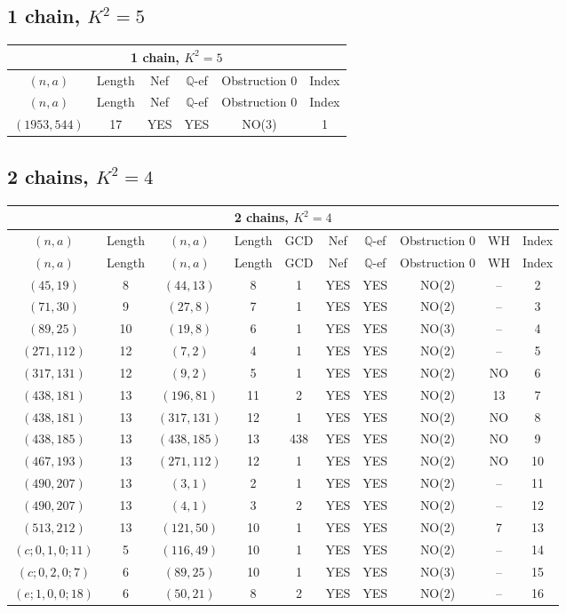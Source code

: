 \subsection{1 chain, \(K^2 = 5\)}
\begin{longtable}{|c|c|c|c|c|c|}
\hline
\multicolumn{6}{|c|}{1 chain, $K^2 = 5$}\\
\hline
$(n,a)$ & Length & Nef & $\mathbb Q$-ef & Obstruction 0 & Index\\
\hline
\endfirsthead

\hline
$(n,a)$ & Length & Nef & $\mathbb Q$-ef & Obstruction 0 & Index\\
\hline
\endhead
\hline
\endfoot

$(1953, 544)$ & 17 & YES & YES & NO(3) & 1
\end{longtable}
\subsection{2 chains, \(K^2 = 4\)}
\begin{longtable}{|c|c|c|c|c|c|c|c|c|c|}
\hline
\multicolumn{10}{|c|}{2 chains, $K^2 = 4$}\\
\hline
$(n,a)$ & Length & $(n,a)$ & Length & GCD & Nef & $\mathbb Q$-ef & Obstruction 0 & WH & Index\\
\hline
\endfirsthead

\hline
$(n,a)$ & Length & $(n,a)$ & Length & GCD & Nef & $\mathbb Q$-ef & Obstruction 0 & WH & Index\\
\hline
\endhead
\hline
\endfoot

$(45, 19)$ & 8 & $(44, 13)$ & 8 & 1 & YES & YES & NO(2) & -- & 2\\
$(71, 30)$ & 9 & $(27, 8)$ & 7 & 1 & YES & YES & NO(2) & -- & 3\\
$(89, 25)$ & 10 & $(19, 8)$ & 6 & 1 & YES & YES & NO(3) & -- & 4\\
$(271, 112)$ & 12 & $(7, 2)$ & 4 & 1 & YES & YES & NO(2) & -- & 5\\
$(317, 131)$ & 12 & $(9, 2)$ & 5 & 1 & YES & YES & NO(2) & NO & 6\\
$(438, 181)$ & 13 & $(196, 81)$ & 11 & 2 & YES & YES & NO(2) & 13 & 7\\
$(438, 181)$ & 13 & $(317, 131)$ & 12 & 1 & YES & YES & NO(2) & NO & 8\\
$(438, 185)$ & 13 & $(438, 185)$ & 13 & 438 & YES & YES & NO(2) & NO & 9\\
$(467, 193)$ & 13 & $(271, 112)$ & 12 & 1 & YES & YES & NO(2) & NO & 10\\
$(490, 207)$ & 13 & $(3, 1)$ & 2 & 1 & YES & YES & NO(2) & -- & 11\\
$(490, 207)$ & 13 & $(4, 1)$ & 3 & 2 & YES & YES & NO(2) & -- & 12\\
$(513, 212)$ & 13 & $(121, 50)$ & 10 & 1 & YES & YES & NO(2) & 7 & 13\\
$(c; 0, 1, 0; 11)$ & 5 & $(116, 49)$ & 10 & 1 & YES & YES & NO(2) & -- & 14\\
$(c; 0, 2, 0; 7)$ & 6 & $(89, 25)$ & 10 & 1 & YES & YES & NO(3) & -- & 15\\
$(e; 1, 0, 0; 18)$ & 6 & $(50, 21)$ & 8 & 2 & YES & YES & NO(2) & -- & 16
\end{longtable}
